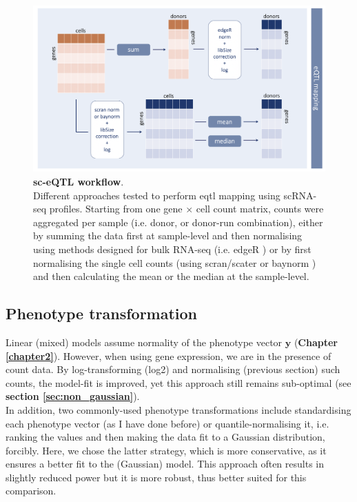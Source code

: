 \begin{figure}[h]
\centering
\includegraphics[width=16cm]{Chapter3/Fig/sc_qtl_workflow_no1_2_steps.png}
\caption[sc-eQTL workflow]{\textbf{sc-eQTL workflow}.\\
Different approaches tested to perform \gls{eqtl} mapping using scRNA-seq profiles.
Starting from one gene $\times$ cell count matrix, counts were aggregated per sample (i.e. donor, or donor-run combination), either by summing the data first at sample-level and then normalising using methods designed for bulk RNA-seq (i.e. edgeR \cite{robinson2010edger}) or by first normalising the single cell counts (using scran/scater \cite{mccarthy2017scater} or baynorm \cite{tang2020baynorm}) and then calculating the mean or the median at the sample-level. }
\label{fig:sc_qtl_workflow}
\end{figure}

\subsection{Phenotype transformation}

Linear (mixed) models assume normality of the phenotype vector $\mathbf{y}$ (\textbf{Chapter
\ref{chapter2}}).
However, when using gene expression, we are in the presence of count data.
By log-transforming (log2) and normalising (previous section) such counts, the model-fit is improved, yet this approach still remains sub-optimal (see \textbf{section \ref{sec:non_gaussian}}). \\

In addition, two commonly-used phenotype transformations include standardising each phenotype vector (as I have done before) or quantile-normalising it, i.e. ranking the values and then making the data fit to a Gaussian distribution, forcibly.
Here, we chose the latter strategy, which is more conservative, as it ensures a better fit to the (Gaussian) model.
This approach often results in slightly reduced power but it is more robust, thus better suited for this comparison.

